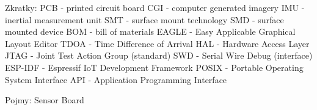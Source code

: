 Zkratky:
PCB - printed circuit board
CGI - computer generated imagery
IMU - inertial measurement unit
SMT - surface mount technology
SMD - surface mounted device
BOM - bill of materials
EAGLE - Easy Applicable Graphical Layout Editor
TDOA - Time Difference of Arrival
HAL - Hardware Access Layer
JTAG - Joint Test Action Group (standard)
SWD - Serial Wire Debug (interface)
ESP-IDF - Espressif IoT Development Framework
POSIX - Portable Operating System Interface
API - Application Programming Interface

Pojmy:
Sensor Board